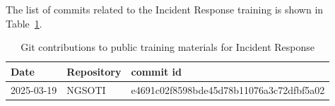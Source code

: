 \documentclass[10pt,a4paper]{report}
\begin{document}
The list of commits related to the Incident Response training is shown in
Table~\ref{ir}.

\begin{table}[h]
\begin{tabular}{lll}
    Date & Repository & commit id \\
    \hline
    2025-03-19 & NGSOTI & e4691c02f8598bde45d78b11076a3c72dfbf5a02\\
\end{tabular}
\caption{Git contributions to public training materials for Incident Response}
\label{ir}
\end{table}

\end{document}
